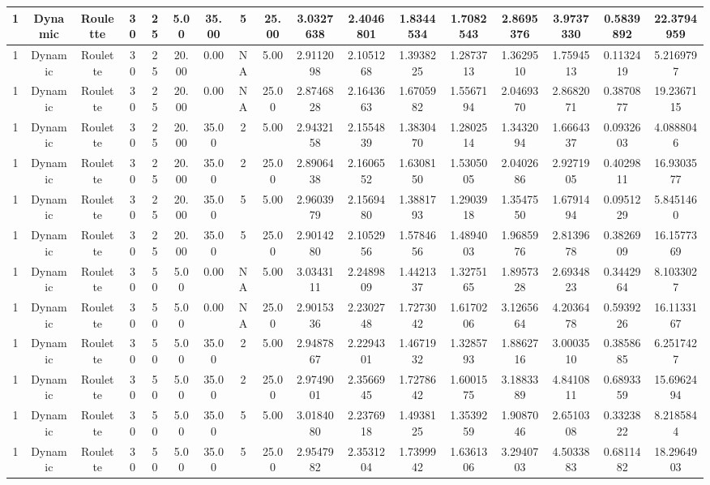 \documentclass[a4paper]{article}
\begin{document}
\begin{center}
\begin{tabular}{ | c | c | c | c | c | c | c | c | c | c | c | c | c | c | c | c | c | }
		\hline
		1	&	Dynamic	&	Roulette	&	30	&	25	&	5.00	&	35.00	&	5	&	25.00	&	3.0327638	&	2.4046801	&	1.8344534	&	1.7082543	&	2.8695376	&	3.9737330	&	0.5839892	&	22.3794959 \\
		\hline
		1	&	Dynamic	&	Roulette	&	30	&	25	&	20.00	&	0.00	&	NA	&	5.00	&	2.9112098	&	2.1051268	&	1.3938225	&	1.2873713	&	1.3629510	&	1.7594513	&	0.1132419	&	5.2169797 \\
		\hline
		1	&	Dynamic	&	Roulette	&	30	&	25	&	20.00	&	0.00	&	NA	&	25.00	&	2.8746828	&	2.1643663	&	1.6705982	&	1.5567194	&	2.0469370	&	2.8682071	&	0.3870877	&	19.2367115 \\
		\hline
		1	&	Dynamic	&	Roulette	&	30	&	25	&	20.00	&	35.00	&	2	&	5.00	&	2.9432158	&	2.1554839	&	1.3830470	&	1.2802514	&	1.3432094	&	1.6664337	&	0.0932603	&	4.0888046 \\
		\hline
		1	&	Dynamic	&	Roulette	&	30	&	25	&	20.00	&	35.00	&	2	&	25.00	&	2.8906438	&	2.1606552	&	1.6308150	&	1.5305005	&	2.0402686	&	2.9271905	&	0.4029811	&	16.9303577 \\
		\hline
		1	&	Dynamic	&	Roulette	&	30	&	25	&	20.00	&	35.00	&	5	&	5.00	&	2.9603979	&	2.1569480	&	1.3881793	&	1.2903918	&	1.3547550	&	1.6791494	&	0.0951229	&	5.8451460 \\
		\hline
		1	&	Dynamic	&	Roulette	&	30	&	25	&	20.00	&	35.00	&	5	&	25.00	&	2.9014280	&	2.1052956	&	1.5784656	&	1.4894003	&	1.9685976	&	2.8139678	&	0.3826909	&	16.1577369 \\
		\hline
		1	&	Dynamic	&	Roulette	&	30	&	50	&	5.00	&	0.00	&	NA	&	5.00	&	3.0343111	&	2.2489809	&	1.4421337	&	1.3275165	&	1.8957328	&	2.6934823	&	0.3442964	&	8.1033027 \\
		\hline
		1	&	Dynamic	&	Roulette	&	30	&	50	&	5.00	&	0.00	&	NA	&	25.00	&	2.9015336	&	2.2302748	&	1.7273042	&	1.6170206	&	3.1265664	&	4.2036478	&	0.5939226	&	16.1133167 \\
		\hline
		1	&	Dynamic	&	Roulette	&	30	&	50	&	5.00	&	35.00	&	2	&	5.00	&	2.9487867	&	2.2294301	&	1.4671932	&	1.3285793	&	1.8862716	&	3.0003510	&	0.3858685	&	6.2517427 \\
		\hline
		1	&	Dynamic	&	Roulette	&	30	&	50	&	5.00	&	35.00	&	2	&	25.00	&	2.9749001	&	2.3566945	&	1.7278642	&	1.6001575	&	3.1883389	&	4.8410811	&	0.6893359	&	15.6962494 \\
		\hline
		1	&	Dynamic	&	Roulette	&	30	&	50	&	5.00	&	35.00	&	5	&	5.00	&	3.0184080	&	2.2376918	&	1.4938125	&	1.3539259	&	1.9087046	&	2.6510308	&	0.3323822	&	8.2185844 \\
		\hline
		1	&	Dynamic	&	Roulette	&	30	&	50	&	5.00	&	35.00	&	5	&	25.00	&	2.9547982	&	2.3531204	&	1.7399942	&	1.6361306	&	3.2940703	&	4.5033883	&	0.6811482	&	18.2964903 \\

\end{tabular}
\end{center}
\end{document}

